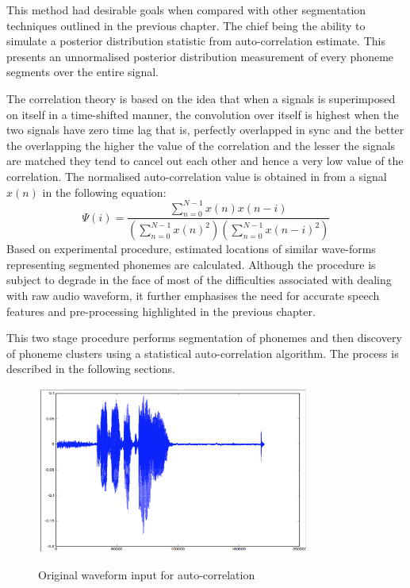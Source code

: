 This method had desirable goals when compared with other segmentation techniques outlined in the previous chapter. The chief being the ability to simulate a posterior distribution statistic from auto-correlation estimate.  This presents an unnormalised posterior distribution measurement of every phoneme segments over the entire signal.

The correlation theory is based on the idea that when a signals is superimposed on itself in a time-shifted manner, the convolution over itself is highest when the two signals have zero time lag that is, perfectly overlapped in sync and the better the overlapping the higher the value of the correlation and the lesser the signals are matched they tend to cancel out each other and hence a very low value of the correlation.  The normalised auto-correlation value is obtained in \cite{picone1996fundamentals} from a signal $x(n)$ in the following equation:
\begin{equation}
    \Psi(i)=\frac{\sum_{n=0}^{N-1}x(n)x(n-i)}{\left(\sum_{n=0}^{N-1}x(n)^2\right)\left(\sum_{n=0}^{N-1}x(n-i)^2\right)}\label{c3eq_corr}
\end{equation}
Based on experimental procedure, estimated locations of similar wave-forms representing segmented phonemes are calculated.  Although the procedure is subject to degrade in the face of most of the difficulties associated with dealing with raw audio waveform, it further emphasises the need for accurate speech features and pre-processing highlighted in the previous chapter.

This two stage procedure performs segmentation of phonemes and then discovery of phoneme clusters using a statistical auto-correlation algorithm.  The process is described in the following sections.
\begin{figure}
\centering
  \includegraphics[width=9cm]{thesis/images/corr}\\
  \caption{Original waveform input for auto-correlation}\label{fig_c3_exp01}
\end{figure}

